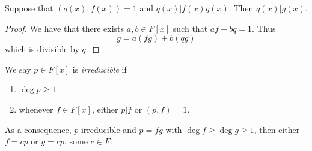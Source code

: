 \begin{lemma}
	Suppose that $\left( q(x), f(x) \right)  = 1$ and $q(x) | f(x) g(x)$. Then  $q(x) | g(x)$.
\end{lemma}
\begin{proof}
	We have that there exists $a, b \in F[x]$ such that $af + bq = 1$. Thus
	\[
		g = a(fg) + b(qg)
	\] 
	which is divisible by $q$.
\end{proof}


\begin{definition}
	We say $p \in F[x]$ is \textit{irreducible} if
	\begin{enumerate}
		\item $\operatorname{deg} p \ge 1$ 
		\item whenever $f \in F[x]$, either $p | f$ or $(p, f) = 1$.
	\end{enumerate}
\end{definition}
As a consequence, $p$ irreducible and $p = f g$ with $\operatorname{deg} f \ge \operatorname{deg} g\ge 1$, then either $f = c p$ or $g = c p$, some $c \in F$.
